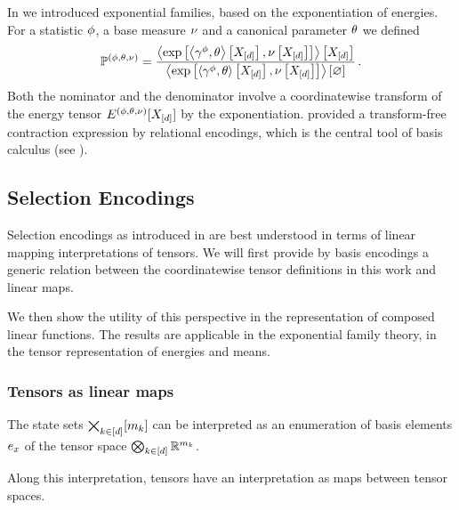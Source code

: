 \begin{example}
    In  we introduced exponential families, based on the exponentiation of energies.
    For a statistic $\phi$, a base measure $\nu$ and a canonical parameter $\theta$ we defined
    \begin{align*}
        \mathbb{P}^{(\phi,\theta,\nu)} = \frac{
            \left\langle \mathrm{exp}\left[\left\langle \gamma^{\phi},\theta\right\rangle \left[ X_{[d]} \right],\nu\left[X_{[d]}\right]\right]\right\rangle \left[ X_{[d]} \right]
        }{
            \left\langle \mathrm{exp}\left[\left\langle \gamma^{\phi},\theta\right\rangle \left[ X_{[d]} \right],\nu\left[X_{[d]}\right]\right]\right\rangle \left[ \varnothing \right]
        } \, .
    \end{align*}
    Both the nominator and the denominator involve a coordinatewise transform of the energy tensor $E^{(\phi,\theta,\nu)}[X_{[d]}]$ by the exponentiation.
     provided a transform-free contraction expression by relational encodings, which is the central tool of basis calculus (see ).
\end{example}



\subsection{Selection Encodings}

Selection encodings as introduced in  are best understood in terms of linear mapping interpretations of tensors.
We will first provide by basis encodings a generic relation between the coordinatewise tensor definitions in this work and linear maps.

We then show the utility of this perspective in the representation of composed linear functions.
The results are applicable in the exponential family theory, in the tensor representation of energies and means.

\subsubsection{Tensors as linear maps}

The state sets $\bigtimes_{k\in[d]}[m_{k}]$ can be interpreted as an enumeration of basis elements $e_{x}$ of the tensor space $\bigotimes_{k\in[d]} \mathbb{R}^{m_{k}}$.

Along this interpretation, tensors have an interpretation as maps between tensor spaces.



